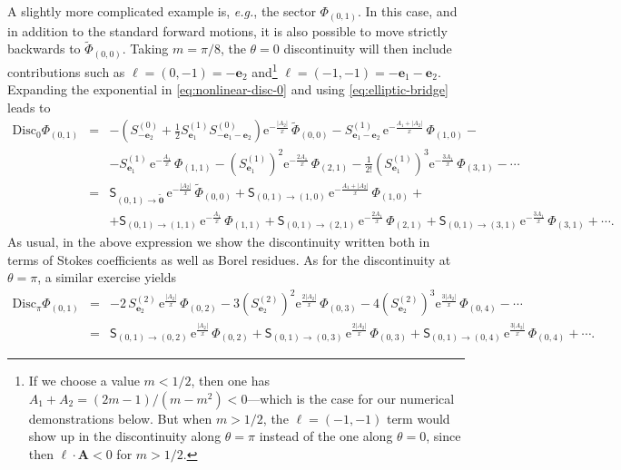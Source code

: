 \documentclass[11pt,a4paper]{article}
\def\disc{{\mathrm{Disc}}}
\begin{document}
A slightly more complicated example is, \textit{e.g.}, the sector $\Phi_{(0,1)}$. In this case, and in addition to the standard forward motions, it is also possible to move strictly backwards to $\widetilde{\Phi}_{(0,0)}$. Taking $m=\pi/8$, the $\theta=0$ discontinuity will then include contributions such as $\boldsymbol{\ell} = (0,-1) = - \boldsymbol{e}_2$ and\footnote{If we choose a value $m<1/2$, then one has $A_1+A_2=(2m-1)/(m-m^2)<0$---which is the case for our numerical demonstrations below. But when $m>1/2$, the $\boldsymbol{\ell} = (-1,-1)$ term would show up in the discontinuity along $\theta=\pi$ instead of the one along $\theta=0$, since then $\boldsymbol{\ell} \cdot \boldsymbol{A} < 0$ for $m>1/2$.} $\boldsymbol{\ell} = (-1,-1) = - \boldsymbol{e}_1 - \boldsymbol{e}_2$. Expanding the exponential in \eqref{eq:nonlinear-disc-0} and using \eqref{eq:elliptic-bridge} leads to
%
\begin{eqnarray}
\label{eq:01-disc-0}
\disc_0 \Phi_{(0,1)} &=& - \left( S^{(0)}_{-\boldsymbol{e}_2}+\frac{1}{2} S^{(1)}_{\boldsymbol{e}_1} S^{(0)}_{-\boldsymbol{e}_1-\boldsymbol{e}_2} \right) \mathrm{e}^{-\frac{|A_2|}{x}}\, \widetilde \Phi_{(0,0)} - S^{(1)}_{\boldsymbol{e}_1-\boldsymbol{e}_2}\, \mathrm{e}^{-\frac{A_1+|A_2|}{x}}\, \Phi_{(1,0)} - \\
&& - S^{(1)}_{\boldsymbol{e}_1}\, \mathrm{e}^{-\frac{A_1}{x}}\, \Phi_{(1,1)} - \left( S^{(1)}_{\boldsymbol{e}_1} \right)^2 \mathrm{e}^{-\frac{2A_1}{x}}\, \Phi_{(2,1)} - \frac{1}{2!} \left( S^{(1)}_{\boldsymbol{e}_1} \right)^3 \mathrm{e}^{-\frac{3A_1}{x}}\, \Phi_{(3,1)} - \cdots \nonumber \\
&=& \mathsf{S}_{(0,1) \rightarrow \widetilde{\boldsymbol{0}}}\, \mathrm{e}^{-\frac{|A_2|}{x}}\, \widetilde{\Phi}_{(0,0)} + \mathsf{S}_{(0,1) \rightarrow (1,0)}\, \mathrm{e}^{-\frac{A_1+|A_2|}{x}}\, \Phi_{(1,0)} + \\
&& + \mathsf{S}_{(0,1) \rightarrow (1,1)}\, \mathrm{e}^{-\frac{A_1}{x}}\, \Phi_{(1,1)} + \mathsf{S}_{(0,1) \rightarrow (2,1)}\, \mathrm{e}^{-\frac{2A_1}{x}}\, \Phi_{(2,1)} + \mathsf{S}_{(0,1) \rightarrow (3,1)}\, \mathrm{e}^{-\frac{3A_1}{x}}\, \Phi_{(3,1)} + \cdots. \nonumber
\end{eqnarray}
%
\noindent
As usual, in the above expression we show the discontinuity written both in terms of Stokes coefficients as well as Borel residues. As for the discontinuity at $\theta=\pi$, a similar exercise yields
%
\begin{eqnarray}
\disc_\pi \Phi_{(0,1)} &=& - 2\, S^{(2)}_{\boldsymbol{e}_2}\, \mathrm{e}^{\frac{|A_2|}{x}}\, \Phi_{(0,2)} - 3 \left( S^{(2)}_{\boldsymbol{e}_2} \right)^2 \mathrm{e}^{\frac{2 |A_2|}{x}}\, \Phi_{(0,3)} - 4 \left( S^{(2)}_{\boldsymbol{e}_2} \right)^3 \mathrm{e}^{\frac{3 |A_2|}{x}}\, \Phi_{(0,4)} - \cdots 
\label{eq:01-disc-pi} \\
&=& \mathsf{S}_{(0,1) \rightarrow (0,2)}\, \mathrm{e}^{\frac{|A_2|}{x}}\, \Phi_{(0,2)} + \mathsf{S}_{(0,1) \rightarrow (0,3)}\, \mathrm{e}^{\frac{2 |A_2|}{x}}\, \Phi_{(0,3)} + \mathsf{S}_{(0,1) \rightarrow (0,4)}\, \mathrm{e}^{\frac{3 |A_2|}{x}}\, \Phi_{(0,4)} + \cdots. \nonumber
\end{eqnarray}
\end{document}
